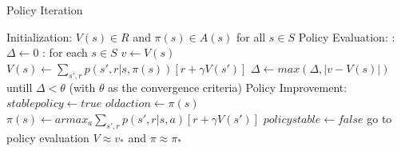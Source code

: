 \documentclass[a4paper,11pt]{article}
\begin{document}
 
\begin{algorithm}
	\caption{Policy Iteration} 
	\begin{algorithmic}[1]
		\State Initialization:
			\Require $V(s) \in R$ and $\pi(s) \in A(s) $  for all $ s \in S $ 
			\State Policy Evaluation:
			\Loop :  $\Delta \leftarrow 0$
				\Loop : for each $s \in S$ 
					\State $v \leftarrow V(s)$
					\State $V(s) \leftarrow \sum_{s',r} p(s',r|s, \pi(s))[r+\gamma V(s')]$
					\State $\Delta \leftarrow max(\Delta, |v-V(s)|)$
				\EndLoop
				\State untill  $\Delta < \theta$ (with $\theta$ as the convergence criteria) 
			\EndLoop
		\State Policy Improvement:
			\State $stable policy \leftarrow true $ 
				\State  $old action \leftarrow \pi(s)$
				\State $\pi(s) \leftarrow armax _a \sum_{s',r} p(s',r|s,a)[r + \gamma V(s')] $
					\State $policystable \leftarrow false$ go to policy evaluation
				\Else \State
				\Return $ V \approx v_*$ and $\pi \approx \pi_*$
				\EndIf
			\EndFor

	\end{algorithmic} 
\end{algorithm}
\end{document}
